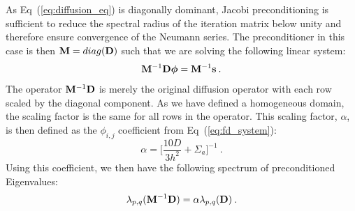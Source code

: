 \documentclass[letterpaper,12pt]{article}
\begin{document}
As Eq~(\ref{eq:diffusion_eq}) is diagonally dominant, Jacobi
preconditioning is sufficient to reduce the spectral radius of the
iteration matrix below unity and therefore ensure convergence of the
Neumann series. The preconditioner in this case is then $\mathbf{M} =
diag(\mathbf{D})$ such that we are solving the following linear system:
\begin{equation}
  \mathbf{M}^{-1} \mathbf{D} \boldsymbol{\phi} = \mathbf{M}^{-1} \mathbf{s}\:.
  \label{eq:precond_diffsion}
\end{equation}
The operator $\mathbf{M}^{-1} \mathbf{D}$ is merely the original diffusion
operator with each row scaled by the diagonal component. As we have
defined a homogeneous domain, the scaling factor is the same for all
rows in the operator. This scaling factor, $\alpha$, is then defined
as the $\phi_{i,j}$ coefficient from Eq~(\ref{eq:fd_system}):
\begin{equation}
  \alpha = \Bigg[\frac{10 D}{3 h^2} + \Sigma_a\Bigg]^{-1}\:.
  \label{eq:jacobi_scaling}
\end{equation}
Using this coefficient, we then have the following spectrum of
preconditioned Eigenvalues:
\begin{equation}
  \lambda_{p,q}(\mathbf{M}^{-1} \mathbf{D}) = \alpha \lambda_{p,q}(\mathbf{D})\:.
  \label{eq:preconditioned_Eigenvalues}
\end{equation}
\end{document}
